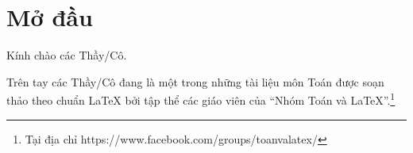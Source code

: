 \documentclass[12pt,a4paper,oneside]{book}
\renewcommand{\baselinestretch}{1.4}
\theoremstyle{nonumberplain}
\numberwithin{equation}{section}
\renewcommand{\baselinestretch}{1.4}
\begin{document}

\pagestyle{empty}
	\renewcommand{\headrulewidth}{0.4pt}
	
	\renewcommand{\baselinestretch}{1.3}
	
	
	\pagestyle{fancy}
	\chead{\empty}
	\rhead{\currfilename}
	\lfoot{\empty}
	\tableofcontents
		\chapter*{Mở đầu}
	Kính chào các Thầy/Cô.
	
	\vspace{0.6cm}
	
	\noindent Trên tay các Thầy/Cô đang là một trong những tài liệu môn Toán được soạn thảo theo chuẩn \LaTeX{} bởi tập thể các giáo viên của ``Nhóm Toán và LaTeX''.\footnote{Tại địa chỉ https://www.facebook.com/groups/toanvalatex/}
	
	\vspace{0.6cm}
	
\end{document}
